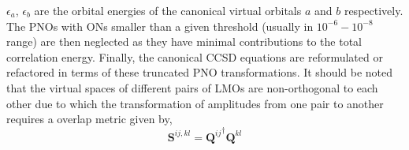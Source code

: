 $\epsilon_a$, $\epsilon_b$ are the orbital energies of the canonical virtual orbitals
$a$ and $b$ respectively. The PNOs with ONs smaller than a given threshold (usually
in $10^{-6} - 10^{-8}$ range) are then neglected as they have minimal contributions
to the total correlation energy. Finally, the canonical CCSD equations are reformulated
or refactored in terms of these truncated PNO transformations. It should be noted that the virtual
spaces of different pairs of LMOs are non-orthogonal to each other due to which the transformation
of amplitudes from one pair to another requires a overlap metric given by, 
\\
\begin{equation}
\bm{S}^{ij,kl} = {\bm{Q}^{ij}}^{\dagger} \bm{Q}^{kl}
\end{equation}
